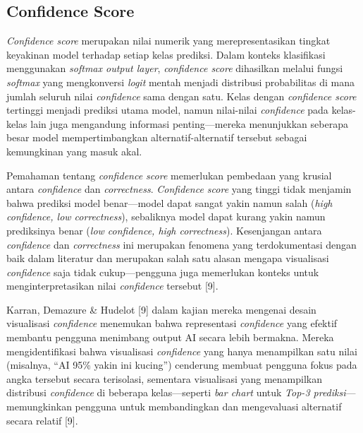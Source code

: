 \documentclass[10pt,twoside,openright]{report}
\begin{document}
\subsection{Confidence Score}
\label{subsec:confidence-score}

\textit{Confidence score} merupakan nilai numerik yang merepresentasikan tingkat keyakinan model terhadap setiap kelas prediksi. Dalam konteks klasifikasi menggunakan \textit{softmax output layer}, \textit{confidence score} dihasilkan melalui fungsi \textit{softmax} yang mengkonversi \textit{logit} mentah menjadi distribusi probabilitas di mana jumlah seluruh nilai \textit{confidence} sama dengan satu. Kelas dengan \textit{confidence score} tertinggi menjadi prediksi utama model, namun nilai-nilai \textit{confidence} pada kelas-kelas lain juga mengandung informasi penting—mereka menunjukkan seberapa besar model mempertimbangkan alternatif-alternatif tersebut sebagai kemungkinan yang masuk akal.

Pemahaman tentang \textit{confidence score} memerlukan pembedaan yang krusial antara \textit{confidence} dan \textit{correctness}. \textit{Confidence score} yang tinggi tidak menjamin bahwa prediksi model benar—model dapat sangat yakin namun salah (\textit{high confidence, low correctness}), sebaliknya model dapat kurang yakin namun prediksinya benar (\textit{low confidence, high correctness}). Kesenjangan antara \textit{confidence} dan \textit{correctness} ini merupakan fenomena yang terdokumentasi dengan baik dalam literatur dan merupakan salah satu alasan mengapa visualisasi \textit{confidence} saja tidak cukup—pengguna juga memerlukan konteks untuk menginterpretasikan nilai \textit{confidence} tersebut [9].

Karran, Demazure \& Hudelot [9] dalam kajian mereka mengenai desain visualisasi \textit{confidence} menemukan bahwa representasi \textit{confidence} yang efektif membantu pengguna menimbang output AI secara lebih bermakna. Mereka mengidentifikasi bahwa visualisasi \textit{confidence} yang hanya menampilkan satu nilai (misalnya, ``AI 95\% yakin ini kucing'') cenderung membuat pengguna fokus pada angka tersebut secara terisolasi, sementara visualisasi yang menampilkan distribusi \textit{confidence} di beberapa kelas—seperti \textit{bar chart} untuk \textit{Top-3 prediksi}—memungkinkan pengguna untuk membandingkan dan mengevaluasi alternatif secara relatif [9].
\end{document}
